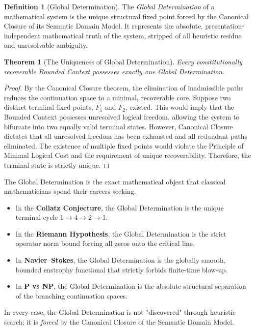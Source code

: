 \documentclass[12pt,openany]{extbook}
\theoremstyle{plain}
\newtheorem{theorem}{Theorem}[chapter]
\theoremstyle{definition}
\newtheorem{definition}{Definition}[chapter]
\begin{document}
\begin{definition}[Global Determination]
The \emph{Global Determination} of a mathematical system is the unique structural fixed point forced by the Canonical Closure of its Semantic Domain Model. It represents the absolute, presentation-independent mathematical truth of the system, stripped of all heuristic residue and unresolvable ambiguity.
\end{definition}

\begin{theorem}[The Uniqueness of Global Determination]
Every constitutionally recoverable Bounded Context possesses exactly one Global Determination.
\end{theorem}

\begin{proof}
By the Canonical Closure theorem, the elimination of inadmissible paths reduces the continuation space to a minimal, recoverable core. 
Suppose two distinct terminal fixed points, $F_1$ and $F_2$, existed. This would imply that the Bounded Context possesses unresolved logical freedom, allowing the system to bifurcate into two equally valid terminal states. 
However, Canonical Closure dictates that all unresolved freedom has been exhausted and all redundant paths eliminated. The existence of multiple fixed points would violate the Principle of Minimal Logical Cost and the requirement of unique recoverability. 
Therefore, the terminal state is strictly unique.
\end{proof}

The Global Determination is the exact mathematical object that classical mathematicians spend their careers seeking. 
\begin{itemize}
    \item In the \textbf{Collatz Conjecture}, the Global Determination is the unique terminal cycle $1 \to 4 \to 2 \to 1$.
    \item In the \textbf{Riemann Hypothesis}, the Global Determination is the strict operator norm bound forcing all zeros onto the critical line.
    \item In \textbf{Navier--Stokes}, the Global Determination is the globally smooth, bounded enstrophy functional that strictly forbids finite-time blow-up.
    \item In \textbf{P vs NP}, the Global Determination is the absolute structural separation of the branching continuation spaces.
\end{itemize}

In every case, the Global Determination is not "discovered" through heuristic search; it is \emph{forced} by the Canonical Closure of the Semantic Domain Model.
\end{document}
